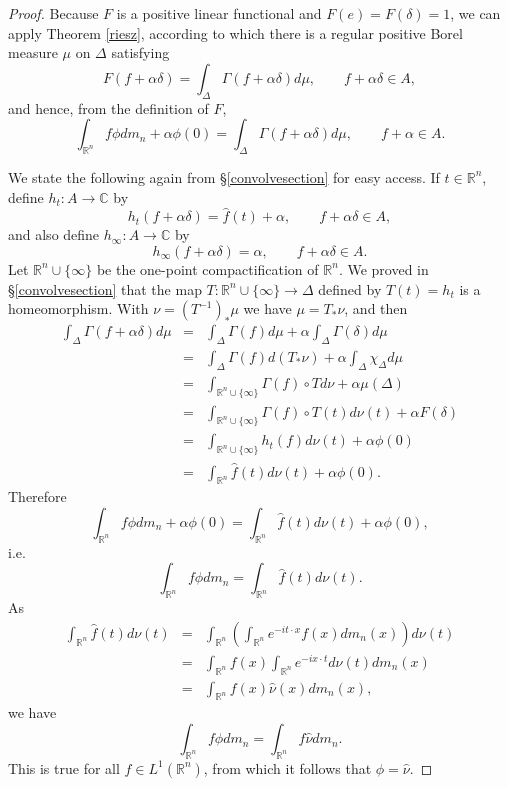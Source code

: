 \documentclass{article}
\theoremstyle{definition}
\begin{document}
\begin{proof}
Because $F$ is a positive linear functional and $F(e)=F(\delta)=1$, we can apply Theorem \ref{riesz}, according to which there is a regular
positive Borel measure $\mu$ on $\Delta$ satisfying
\[
F(f+\alpha \delta) = \int_\Delta \Gamma(f+\alpha \delta) d\mu, \qquad f+\alpha \delta \in A,
\]
and hence, from the definition of $F$,
\[
\int_{\mathbb{R}^n} f\phi dm_n + \alpha \phi(0) = \int_\Delta \Gamma(f+\alpha \delta) d\mu,\qquad f+\alpha \in A.
\]

We state the following again from \S \ref{convolvesection} for easy access. 
If $t \in \mathbb{R}^n$, define $h_t:A \to \mathbb{C}$ by 
\[
h_t(f+\alpha \delta) = \hat{f}(t)+\alpha, \qquad f+\alpha \delta \in A,
\]
and also define $h_\infty:A \to \mathbb{C}$ by
\[
h_\infty(f+\alpha \delta)=\alpha, \qquad f+\alpha \delta \in A.
\]
Let $\mathbb{R}^n \cup \{\infty\}$ be the one-point compactification of $\mathbb{R}^n$. We proved in \S \ref{convolvesection} that the map
$T:\mathbb{R}^n \cup \{\infty\} \to \Delta$  defined by $T(t)=h_t$ is a homeomorphism. With $\nu=(T^{-1})_* \mu$ we have $\mu=T_* \nu$,
and then
\begin{eqnarray*}
\int_\Delta \Gamma(f+\alpha \delta) d\mu&=&\int_\Delta \Gamma(f) d\mu + \alpha \int_\Delta \Gamma(\delta) d\mu\\
&=&\int_\Delta \Gamma(f) d(T_*\nu)+\alpha \int_{\Delta} \chi_\Delta d\mu\\
&=&\int_{\mathbb{R}^n \cup \{\infty\}} \Gamma(f) \circ T d\nu + \alpha \mu(\Delta)\\
&=&\int_{\mathbb{R}^n \cup \{\infty\}} \Gamma(f) \circ T(t) d\nu(t) + \alpha F(\delta)\\
&=&\int_{\mathbb{R}^n \cup \{\infty\}} h_t(f) d\nu(t)+\alpha \phi(0)\\
&=&\int_{\mathbb{R}^n} \hat{f}(t) d\nu(t) +\alpha\phi(0).
\end{eqnarray*}
Therefore
\[
\int_{\mathbb{R}^n} f\phi dm_n + \alpha \phi(0)  = \int_{\mathbb{R}^n} \hat{f}(t) d\nu(t) +\alpha\phi(0),
\]
i.e.
\[
\int_{\mathbb{R}^n} f\phi dm_n = \int_{\mathbb{R}^n} \hat{f}(t) d\nu(t).
\]
As
\begin{eqnarray*}
\int_{\mathbb{R}^n} \hat{f}(t) d\nu(t) &=& \int_{\mathbb{R}^n}\left( \int_{\mathbb{R}^n}  e^{-it\cdot x} f(x) dm_n(x)\right) d\nu(t)\\
&=&\int_{\mathbb{R}^n} f(x) \int_{\mathbb{R}^n} e^{-ix\cdot t} d\nu(t) dm_n(x)\\
&=&\int_{\mathbb{R}^n} f(x) \hat{\nu}(x) dm_n(x),
\end{eqnarray*}
we have
\[
\int_{\mathbb{R}^n} f\phi dm_n = \int_{\mathbb{R}^n} f \hat{\nu} dm_n.
\]
This is true for all $f\in L^1(\mathbb{R}^n)$, from which it follows that $\phi=\hat{\nu}$.
\end{proof}
\end{document}
